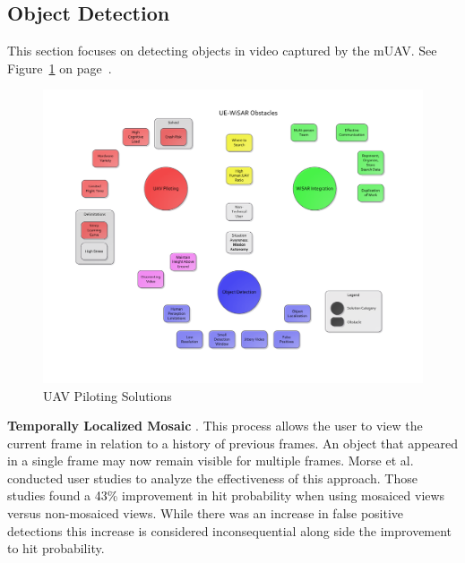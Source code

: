 \documentclass[12pt]{IEEEtran}
\begin{document}
\subsection{Object Detection}
This section focuses on detecting objects
in video captured by the mUAV.  See Figure~\ref{fig:objectdetectionmap} on page~\pageref{fig:objectdetectionmap}.

\begin{figure}[htp]
	\vspace{-55pt}
	\hspace{-80pt}
	\includegraphics[keepaspectratio=true, width=\paperheight,
	height=\paperheight, page=4, angle=90, scale=0.90,
	trim=20 0 20 0]{obstacle_solution_map.pdf}
	\caption{UAV Piloting Solutions}
	\label{fig:objectdetectionmap}
\end{figure}

\textbf{Temporally Localized Mosaic} \cite{morse2008application,
cluff2009unified}.  This process allows the user to view the current frame in relation to a history of previous frames.  An object that appeared in a
single frame may now remain visible for multiple frames.  Morse et al. conducted
user studies to analyze the effectiveness of this
approach.  Those studies found a 43\% improvement in
hit probability when using mosaiced views versus non-mosaiced views.  While
there was an increase in false positive detections this increase is considered
inconsequential along side the improvement to hit probability.
\end{document}
